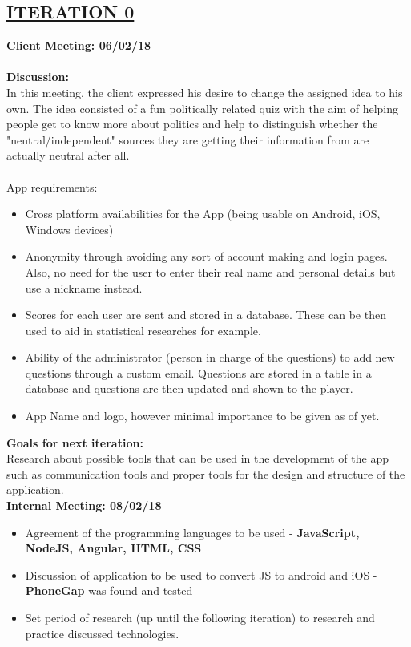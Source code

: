 \documentclass[paper=a4,fontsize=11pt]{article}
\newcommand{\sepspace}{\vspace*{1em}}		%
\newcommand{\SectionPart}[1]{\subsection*{\uppercase{#1}}}
\begin{document}
\SectionPart{\ul{Iteration 0}}
\hfill \textbf{Client Meeting: 06/02/18} \\
\\
\textbf{Discussion:}\\
\noindent
In this meeting, the client expressed his desire to change the assigned idea to his own.
The idea consisted of a fun politically related quiz with the aim of helping people get to
know more about politics and help to distinguish whether the "neutral/independent" sources they
are getting their information from are actually neutral after all.\\\\
\noindent
App requirements:
\begin{itemize}
	\item Cross platform availabilities for the App (being usable on Android, iOS, Windows devices)
	\item Anonymity through avoiding any sort of account making and login pages. Also, no need for the user to enter their real name and personal details but use a nickname instead.
	\item Scores for each user are sent and stored in a database. These can be then used to aid in statistical researches for example.
	\item Ability of the administrator (person in charge of the questions) to add new questions through a custom email. Questions are stored in a table in a database and questions are then updated and shown to the player.
	\item App Name and logo, however minimal importance to be given as of yet.
\end{itemize}
\sepspace

\noindent
\textbf{Goals for next iteration:}\\
\noindent
Research about possible tools that can be used in the development of the app such as communication
tools and proper tools for the design and structure of the application.\\

\hfill \textbf{Internal Meeting: 08/02/18}

\begin{itemize}
	\item Agreement of the programming languages to be used - \textbf{JavaScript, NodeJS, Angular, HTML, CSS}
	\item Discussion of application to be used to convert JS to android and iOS - \textbf{PhoneGap} was found and tested
	\item Set period of research (up until the following iteration) to research and practice discussed technologies.
\end{itemize}
\end{document}
